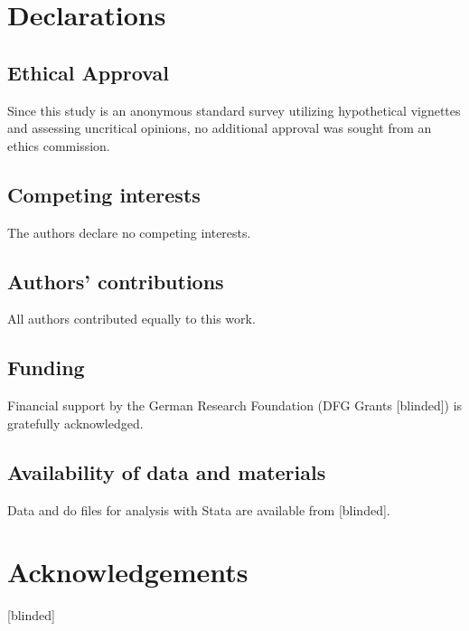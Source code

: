 \documentclass[12pt]{scrartcl}
\begin{document}
\section*{Declarations}\label{sec:declarations}

\subsection*{Ethical Approval}
Since this study is an anonymous standard survey utilizing hypothetical vignettes and assessing uncritical opinions, no additional approval was sought from an ethics commission.

\subsection*{Competing interests}
The authors declare no competing interests.

\subsection*{Authors' contributions}
All authors contributed equally to this work.

\subsection*{Funding}
Financial support by the German Research Foundation (DFG Grants [blinded]) is gratefully acknowledged.

\subsection*{Availability of data and materials}
Data and do files for analysis with Stata are available from [blinded].


\newpage



\section*{Acknowledgements}
[blinded]
\end{document}
